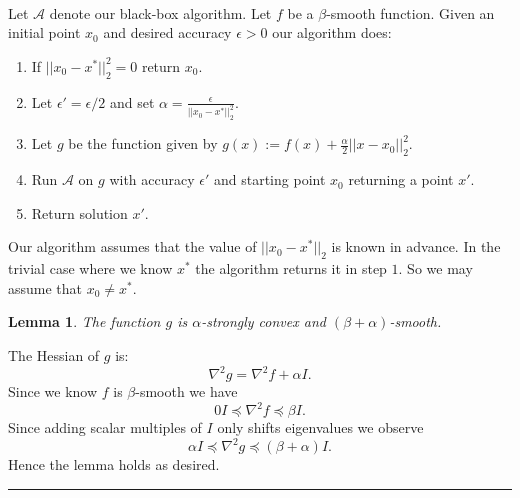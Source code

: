 \documentclass[letterpaper,12pt,oneside,onecolumn]{article}
\newcommand{\cA}{\mathcal{A}} \newcommand{\cB}{\mathcal{B}}
\newenvironment{proof}{{\bf Proof:  }}{\hfill\rule{2mm}{2mm}}
\newtheorem{lemma}[fact]{Lemma}
\begin{document}
\paragraph{}
Let $\cA$ denote our black-box algorithm. Let $f$ be a $\beta$-smooth function. Given an initial point $x_0$ and desired accuracy $\epsilon > 0$ our algorithm does:
\begin{enumerate}
\item If $||x_0 - x^*||_2^2 = 0$ return $x_0$.
\item Let $\epsilon' = \epsilon/2$ and set $\alpha = \frac{\epsilon}{||x_0 - x^*||_2^2}$.
\item Let $g$ be the function given by $g(x) := f(x) + \frac{\alpha}{2}||x - x_0||_2^2$.
\item Run $\cA$ on $g$ with accuracy $\epsilon'$ and starting point $x_0$ returning a point $x'$.
\item Return solution $x'$.
\end{enumerate} 
Our algorithm assumes that the value of $||x_0 - x^*||_2$ is known in advance. In the trivial case where we know $x^*$ the algorithm returns it in step $1$. So we may assume that $x_0 \neq x^*$.
\begin{lemma}\label{lemma:convex-smooth}
The function $g$ is $\alpha$-strongly convex and $(\beta + \alpha)$-smooth.
\end{lemma}
\begin{proof}
The Hessian of $g$ is:
$$\nabla^2 g = \nabla^2 f + \alpha I.$$
Since we know $f$ is $\beta$-smooth we have
$$0I \preccurlyeq \nabla^2 f \preccurlyeq \beta I.$$
Since adding scalar multiples of $I$ only shifts eigenvalues we observe
$$\alpha I \preccurlyeq \nabla^2 g \preccurlyeq (\beta + \alpha) I.$$
Hence the lemma holds as desired. 
\end{proof}
\end{document}
